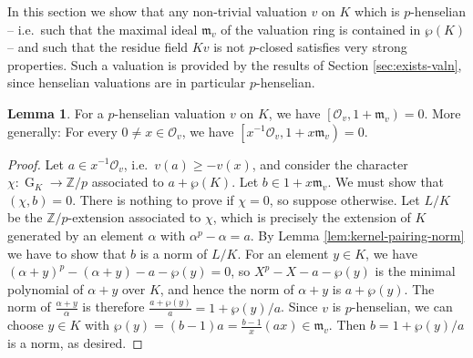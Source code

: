 \documentclass[a4paper, british, oneside]{amsart}
\newcommand{\Z}{\mathbb{Z}}
\DeclareMathOperator{\G}{G}
\newcommand{\pair}[2]{\left[{#1}, {#2}\right)}
\theoremstyle{definition}
\newtheorem{lemma}[theorem]{Lemma}
\theoremstyle{remark}
\begin{document}
In this section we show that any non-trivial valuation $v$ on $K$ which is $p$-henselian --
i.e.\ such that the maximal ideal $\mathfrak{m}_v$ of the valuation ring is contained in $\wp(K)$ \cite{ChatzidakisPerera_pHenselianity} --
and such that the residue field $Kv$ is not $p$-closed satisfies very strong properties.
Such a valuation is provided by the results of Section \ref{sec:exists-valn},
since henselian valuations are in particular $p$-henselian.

\begin{lemma}\label{lem:pairing-props}
  For a $p$-henselian valuation $v$ on $K$, we have $\pair{\mathcal{O}_v}{1 + \mathfrak{m}_v} = 0$.
  More generally:
  For every $0 \neq x \in \mathcal{O}_v$, we have $\pair{x^{-1}\mathcal{O}_v}{1 + x\mathfrak{m}_v} = 0$.
\end{lemma}
\begin{proof}
  Let $a \in x^{-1}\mathcal{O}_v$, i.e.\ $v(a) \geq -v(x)$, and consider the character $\chi \colon \G_K \to \Z/p$ associated to $a + \wp(K)$.
  Let $b \in 1 + x\mathfrak{m}_v$.
  We must show that $(\chi, b) = 0$.
  There is nothing to prove if $\chi = 0$, so suppose otherwise.
  Let $L/K$ be the $\Z/p$-extension associated to $\chi$, which is precisely the extension of $K$ generated by an element $\alpha$ with $\alpha^p - \alpha = a$.
  By Lemma \ref{lem:kernel-pairing-norm} we have to show that $b$ is a norm of $L/K$.
  For an element $y \in K$, we have $(\alpha+y)^p - (\alpha+y) - a - \wp(y) = 0$, so $X^p - X - a - \wp(y)$ is the minimal polynomial of $\alpha+y$ over $K$, and hence the norm of $\alpha+y$ is $a + \wp(y)$.
  The norm of $\frac{\alpha+y}{\alpha}$ is therefore $\frac{a + \wp(y)}{a} = 1 + \wp(y)/a$.
  Since $v$ is $p$-henselian,
  we can choose $y \in K$ with $\wp(y) = (b-1)a = \frac{b-1}{x} (ax) \in \mathfrak{m}_v$.
  Then $b = 1 + \wp(y)/a$ is a norm, as desired.
\end{proof}
\end{document}
